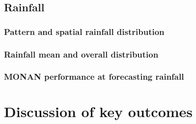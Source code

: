 \subsection{Rainfall}

\subsubsection{Pattern and spatial rainfall distribution}

\subsubsection{Rainfall mean and overall distribution}

\subsubsection{MONAN performance at forecasting rainfall}

\section{Discussion of key outcomes}


